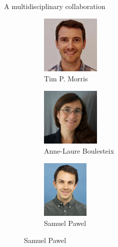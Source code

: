 \documentclass[english, 12pt, aspectratio=169]{beamer}
\begin{document}
\begin{frame}{A multidisciplinary collaboration}
\begin{figure}
        \begin{subfigure}{0.27\textwidth}
            \centering
            \includegraphics[height=2.8cm,frame]{pics/tim_morris.jpg}
            \caption*{Tim P. Morris}
        \end{subfigure}
        \begin{subfigure}{0.27\textwidth}
            \centering
            \includegraphics[height=2.8cm,frame]{pics/al_boulesteix.jpeg}
            \caption*{Anne-Laure Boulesteix}
        \end{subfigure}
        \begin{subfigure}{0.27\textwidth}
            \centering
            \includegraphics[height=2.8cm,frame]{pics/samuel_pawel.jpg}
            \caption*{Samuel Pawel}
        \end{subfigure}
    \end{figure}
\end{frame}
\end{document}
